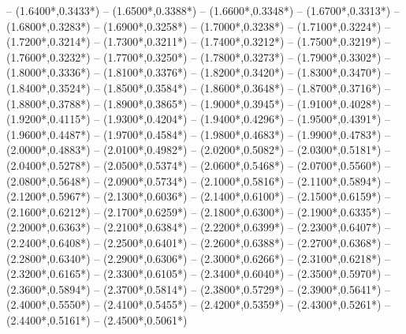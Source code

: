 {	-- ({1.6400*\dx},{0.3433*\dy})
	-- ({1.6500*\dx},{0.3388*\dy})
	-- ({1.6600*\dx},{0.3348*\dy})
	-- ({1.6700*\dx},{0.3313*\dy})
	-- ({1.6800*\dx},{0.3283*\dy})
	-- ({1.6900*\dx},{0.3258*\dy})
	-- ({1.7000*\dx},{0.3238*\dy})
	-- ({1.7100*\dx},{0.3224*\dy})
	-- ({1.7200*\dx},{0.3214*\dy})
	-- ({1.7300*\dx},{0.3211*\dy})
	-- ({1.7400*\dx},{0.3212*\dy})
	-- ({1.7500*\dx},{0.3219*\dy})
	-- ({1.7600*\dx},{0.3232*\dy})
	-- ({1.7700*\dx},{0.3250*\dy})
	-- ({1.7800*\dx},{0.3273*\dy})
	-- ({1.7900*\dx},{0.3302*\dy})
	-- ({1.8000*\dx},{0.3336*\dy})
	-- ({1.8100*\dx},{0.3376*\dy})
	-- ({1.8200*\dx},{0.3420*\dy})
	-- ({1.8300*\dx},{0.3470*\dy})
	-- ({1.8400*\dx},{0.3524*\dy})
	-- ({1.8500*\dx},{0.3584*\dy})
	-- ({1.8600*\dx},{0.3648*\dy})
	-- ({1.8700*\dx},{0.3716*\dy})
	-- ({1.8800*\dx},{0.3788*\dy})
	-- ({1.8900*\dx},{0.3865*\dy})
	-- ({1.9000*\dx},{0.3945*\dy})
	-- ({1.9100*\dx},{0.4028*\dy})
	-- ({1.9200*\dx},{0.4115*\dy})
	-- ({1.9300*\dx},{0.4204*\dy})
	-- ({1.9400*\dx},{0.4296*\dy})
	-- ({1.9500*\dx},{0.4391*\dy})
	-- ({1.9600*\dx},{0.4487*\dy})
	-- ({1.9700*\dx},{0.4584*\dy})
	-- ({1.9800*\dx},{0.4683*\dy})
	-- ({1.9900*\dx},{0.4783*\dy})
	-- ({2.0000*\dx},{0.4883*\dy})
	-- ({2.0100*\dx},{0.4982*\dy})
	-- ({2.0200*\dx},{0.5082*\dy})
	-- ({2.0300*\dx},{0.5181*\dy})
	-- ({2.0400*\dx},{0.5278*\dy})
	-- ({2.0500*\dx},{0.5374*\dy})
	-- ({2.0600*\dx},{0.5468*\dy})
	-- ({2.0700*\dx},{0.5560*\dy})
	-- ({2.0800*\dx},{0.5648*\dy})
	-- ({2.0900*\dx},{0.5734*\dy})
	-- ({2.1000*\dx},{0.5816*\dy})
	-- ({2.1100*\dx},{0.5894*\dy})
	-- ({2.1200*\dx},{0.5967*\dy})
	-- ({2.1300*\dx},{0.6036*\dy})
	-- ({2.1400*\dx},{0.6100*\dy})
	-- ({2.1500*\dx},{0.6159*\dy})
	-- ({2.1600*\dx},{0.6212*\dy})
	-- ({2.1700*\dx},{0.6259*\dy})
	-- ({2.1800*\dx},{0.6300*\dy})
	-- ({2.1900*\dx},{0.6335*\dy})
	-- ({2.2000*\dx},{0.6363*\dy})
	-- ({2.2100*\dx},{0.6384*\dy})
	-- ({2.2200*\dx},{0.6399*\dy})
	-- ({2.2300*\dx},{0.6407*\dy})
	-- ({2.2400*\dx},{0.6408*\dy})
	-- ({2.2500*\dx},{0.6401*\dy})
	-- ({2.2600*\dx},{0.6388*\dy})
	-- ({2.2700*\dx},{0.6368*\dy})
	-- ({2.2800*\dx},{0.6340*\dy})
	-- ({2.2900*\dx},{0.6306*\dy})
	-- ({2.3000*\dx},{0.6266*\dy})
	-- ({2.3100*\dx},{0.6218*\dy})
	-- ({2.3200*\dx},{0.6165*\dy})
	-- ({2.3300*\dx},{0.6105*\dy})
	-- ({2.3400*\dx},{0.6040*\dy})
	-- ({2.3500*\dx},{0.5970*\dy})
	-- ({2.3600*\dx},{0.5894*\dy})
	-- ({2.3700*\dx},{0.5814*\dy})
	-- ({2.3800*\dx},{0.5729*\dy})
	-- ({2.3900*\dx},{0.5641*\dy})
	-- ({2.4000*\dx},{0.5550*\dy})
	-- ({2.4100*\dx},{0.5455*\dy})
	-- ({2.4200*\dx},{0.5359*\dy})
	-- ({2.4300*\dx},{0.5261*\dy})
	-- ({2.4400*\dx},{0.5161*\dy})
	-- ({2.4500*\dx},{0.5061*\dy})
}
